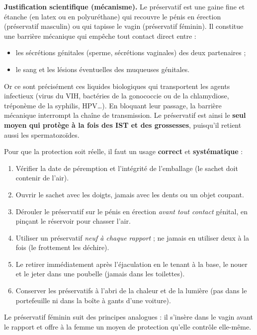 \documentclass[11pt]{article}
\newcommand{\cle}[1]{{\popxbold\color{popdark}#1}}
\begin{document}
\textbf{Justification scientifique (mécanisme).} Le préservatif est une gaine fine et étanche (en latex ou en polyuréthane) qui recouvre le pénis en érection (préservatif masculin) ou qui tapisse le vagin (préservatif féminin). Il constitue une \cle{barrière mécanique} qui empêche tout contact direct entre :
\begin{itemize}
\item les sécrétions génitales (sperme, sécrétions vaginales) des deux partenaires ;
\item le sang et les lésions éventuelles des muqueuses génitales.
\end{itemize}
Or ce sont précisément ces liquides biologiques qui transportent les agents infectieux (virus du VIH, bactéries de la gonococcie ou de la chlamydiose, tréponème de la syphilis, HPV\ldots). En bloquant leur passage, la barrière mécanique interrompt la \cle{chaîne de transmission}. Le préservatif est ainsi le \textbf{seul moyen qui protège à la fois des IST et des grossesses}, puisqu'il retient aussi les spermatozoïdes.

\begin{methode}
Pour que la protection soit réelle, il faut un usage \textbf{correct} et \textbf{systématique} :
\begin{enumerate}
\item Vérifier la date de péremption et l'intégrité de l'emballage (le sachet doit contenir de l'air).
\item Ouvrir le sachet avec les doigts, jamais avec les dents ou un objet coupant.
\item Dérouler le préservatif sur le pénis en érection \emph{avant tout contact} génital, en pinçant le réservoir pour chasser l'air.
\item Utiliser un préservatif \emph{neuf à chaque rapport} ; ne jamais en utiliser deux à la fois (le frottement les déchire).
\item Le retirer immédiatement après l'éjaculation en le tenant à la base, le nouer et le jeter dans une poubelle (jamais dans les toilettes).
\item Conserver les préservatifs à l'abri de la chaleur et de la lumière (pas dans le portefeuille ni dans la boîte à gants d'une voiture).
\end{enumerate}
Le préservatif féminin suit des principes analogues : il s'insère dans le vagin avant le rapport et offre à la femme un moyen de protection qu'elle contrôle elle-même.
\end{methode}
\end{document}
